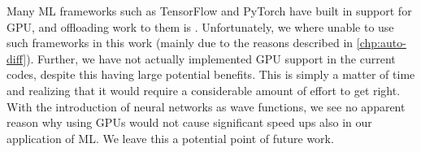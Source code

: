 \documentclass[Thesis.tex]{subfiles}
\begin{document}
Many ML frameworks such as TensorFlow and PyTorch have built in support for GPU,
and offloading work to them is . Unfortunately, we where unable to
use such frameworks in this work (mainly due to the reasons described in
\cref{chp:auto-diff}). Further, we have not actually implemented GPU support in
the current codes, despite this having large potential benefits. This is simply
a matter of time and realizing that it would require a considerable amount of effort
to get right. With the introduction of neural networks as wave functions, we see
no apparent reason why using GPUs would not cause significant speed ups also in
our application of ML. We leave this a potential point of future work.
\end{document}
